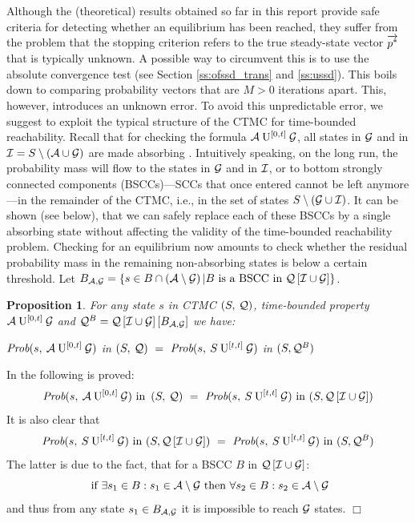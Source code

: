 \documentclass[a4paper,11pt]{article}
\newtheorem{prop}[theorem]{Proposition}
\newenvironment{proof}{\trivlist \item[\hskip \labelsep{\bf Proof}]}{\hfill\hbox{$\Box$}\endtrivlist}
\begin{document}
	Although the (theoretical) results obtained so far in this report provide safe criteria for detecting whether an equilibrium has been reached, they suffer from the problem that the stopping criterion refers to the true steady-state vector $\overrightarrow{p^{*}}$ that is typically unknown.  A possible way to circumvent this is to use the absolute convergence test  (see Section \ref{ss:ofssd_trans} and \ref{ss:ussd}).  This boils down to comparing probability vectors that are $M > 0$ iterations apart.  This, however, introduces an unknown error.  To avoid this unpredictable error, we suggest to exploit the typical structure of the CTMC for time-bounded reachability.  Recall that for checking the formula $\mathcal{A} \: \mathrm{U}^{[0,t]} \: \mathcal{G}$, all states in $\mathcal{G}$ and in $\mathcal{I} = S \setminus \left( \mathcal{A} \cup \mathcal{G} \right)$ are made absorbing \cite{BaierHHK_TSE03}.  Intuitively speaking, on the long run, the probability mass will flow to the states in $\mathcal{G}$ and in $\mathcal{I}$, or to bottom strongly connected components (BSCCs)---SCCs that once entered cannot be left anymore---in the remainder of the CTMC, i.e., in the set of states $S \setminus (\mathcal{G} \cup \mathcal{I})$.  It can be shown (see below), that we can safely replace each of these BSCCs by a single absorbing state without affecting the validity of the time-bounded reachability problem.  Checking for an equilibrium now amounts to check whether the residual probability mass in the remaining non-absorbing states is below a certain threshold.
	Let $B_{ \mathcal{A}, \mathcal{G} } = \left\{ s \in B \cap \left( \mathcal{A} \setminus \mathcal{G} \right) | B \text{ is a BSCC in } \mathcal{Q}\left[ \mathcal{I} \cup \mathcal{G} \right] \right\}$.
	\begin{prop}
	For any state $s$ in CTMC $\left( S,\: \mathcal{Q} \right)$, time-bounded property $\mathcal{A} \: \mathrm{U}^{[0,t]} \: \mathcal{G}$ and $\mathcal{Q}^{B} = \mathcal{Q}\left[ \mathcal{I} \cup \mathcal{G} \right] \left[ B_{ \mathcal{A}, \mathcal{G} } \right]$ we have:
		\begin{center}
			$\mbox{\it Prob}(s, \: \mathcal{A} \: \mathrm{U}^{[0,t]} \: \mathcal{G} )$ in $\left( S,\: \mathcal{Q} \right) \ = \ \mbox{\it Prob}(s, \: S \: \mathrm{U}^{[t,t]} \: \mathcal{G} )$ in $(S,\mathcal{Q}^{B})$
		\end{center}
	\end{prop}
	\begin{proof}
		In \cite{BaierHHK_TSE03} the following is proved:
			\[
				\mbox{\it Prob}(s, \: \mathcal{A} \: \mathrm{U}^{[0,t]} \: \mathcal{G} )\text{ in }\left( S,\: \mathcal{Q} \right) \ = \ \mbox{\it Prob}(s, \: S \: \mathrm{U}^{[t,t]} \: \mathcal{G} )\text{ in }(S,\mathcal{Q}\left[ \mathcal{I} \cup \mathcal{G} \right])
			\]
		It is also clear that
			\[
				\mbox{\it Prob}(s, \: S \: \mathrm{U}^{[t,t]} \: \mathcal{G} )\text{ in }(S,\mathcal{Q}\left[ \mathcal{I} \cup \mathcal{G} \right]) \ = \ \mbox{\it Prob}(s, \: S \: \mathrm{U}^{[t,t]} \: \mathcal{G} )\text{ in }(S,\mathcal{Q}^{B})
			\]
		The latter is due to the fact, that for a BSCC $B$ in $\mathcal{Q}\left[ \mathcal{I} \cup \mathcal{G} \right]$:
			\[
				\text{ if } \exists s_{1} \in B : s_{1} \in \mathcal{A} \setminus \mathcal{G} \text{ then } \forall s_{2} \in B : s_{2} \in \mathcal{A} \setminus \mathcal{G}
			\]
		and thus from any state $s_{1} \in B_{ \mathcal{A}, \mathcal{G} }$ it is impossible to reach $\mathcal{G}$ states.
	\end{proof}
	
\end{document}
